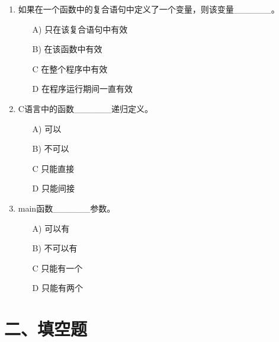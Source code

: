 \documentclass[a4paper,12pt]{article}
\begin{document}
\begin{enumerate}
	\item 如果在一个函数中的复合语句中定义了一个变量，则该变量\_\_\_\_\_\_。
	      \begin{enumerate}
		      \item[A)] 只在该复合语句中有效
		      \item[B)] 在该函数中有效
		      \item[C] 在整个程序中有效
		      \item[D] 在程序运行期间一直有效
	      \end{enumerate}
	      \vspace{0.3cm}

	\item C语言中的函数\_\_\_\_\_\_递归定义。
	      \begin{enumerate}
		      \item[A)] 可以
		      \item[B)] 不可以
		      \item[C] 只能直接
		      \item[D] 只能间接
	      \end{enumerate}
	      \vspace{0.3cm}

	\item main函数\_\_\_\_\_\_参数。
	      \begin{enumerate}
		      \item[A)] 可以有
		      \item[B)] 不可以有
		      \item[C] 只能有一个
		      \item[D] 只能有两个
	      \end{enumerate}
	      \vspace{0.3cm}
\end{enumerate}

\section*{二、填空题}
\end{document}
